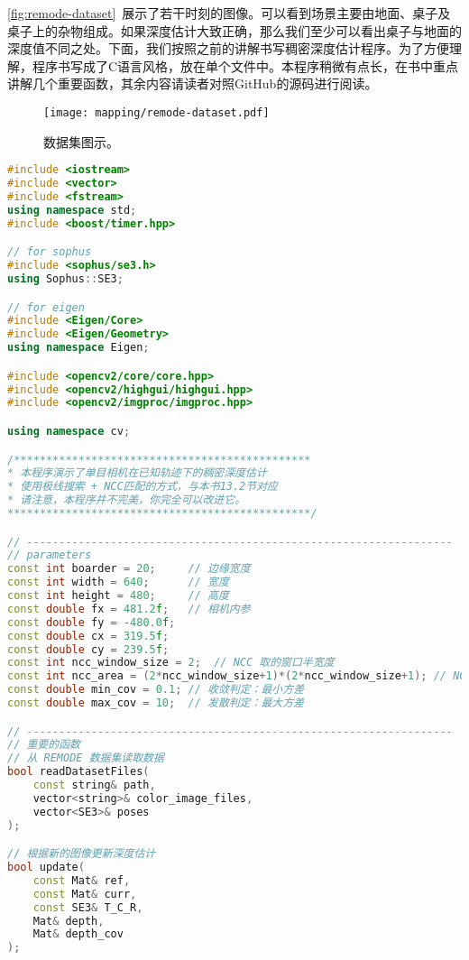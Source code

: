 \autoref{fig:remode-dataset}~展示了若干时刻的图像。可以看到场景主要由地面、桌子及桌子上的杂物组成。如果深度估计大致正确，那么我们至少可以看出桌子与地面的深度值不同之处。下面，我们按照之前的讲解书写稠密深度估计程序。为了方便理解，程序书写成了C语言风格，放在单个文件中。本程序稍微有点长，在书中重点讲解几个重要函数，其余内容请读者对照GitHub的源码进行阅读。

\begin{figure}[!ht]
	\centering
	\texttt{[image: mapping/remode-dataset.pdf]}
	\caption{数据集图示。}
	\label{fig:remode-dataset}
\end{figure}

\begin{lstlisting}[language=c++,caption=slambook/ch13/dense\_monocular/dense\_mapping.cpp（片段）]
#include <iostream>
#include <vector>
#include <fstream>
using namespace std; 
#include <boost/timer.hpp>

// for sophus 
#include <sophus/se3.h>
using Sophus::SE3;

// for eigen 
#include <Eigen/Core>
#include <Eigen/Geometry>
using namespace Eigen;

#include <opencv2/core/core.hpp>
#include <opencv2/highgui/highgui.hpp>
#include <opencv2/imgproc/imgproc.hpp>

using namespace cv;

/**********************************************
* 本程序演示了单目相机在已知轨迹下的稠密深度估计
* 使用极线搜索 + NCC匹配的方式，与本书13.2节对应
* 请注意，本程序并不完美，你完全可以改进它。
***********************************************/

// ------------------------------------------------------------------
// parameters 
const int boarder = 20; 	// 边缘宽度
const int width = 640;  	// 宽度
const int height = 480;  	// 高度
const double fx = 481.2f;	// 相机内参
const double fy = -480.0f;
const double cx = 319.5f;
const double cy = 239.5f;
const int ncc_window_size = 2;	// NCC 取的窗口半宽度
const int ncc_area = (2*ncc_window_size+1)*(2*ncc_window_size+1); // NCC窗口面积
const double min_cov = 0.1;	// 收敛判定：最小方差
const double max_cov = 10;	// 发散判定：最大方差

// ------------------------------------------------------------------
// 重要的函数 
// 从 REMODE 数据集读取数据  
bool readDatasetFiles( 
	const string& path, 
	vector<string>& color_image_files, 
	vector<SE3>& poses 
);

// 根据新的图像更新深度估计
bool update( 
	const Mat& ref, 
	const Mat& curr, 
	const SE3& T_C_R, 
	Mat& depth, 
	Mat& depth_cov 
);


\end{lstlisting}
